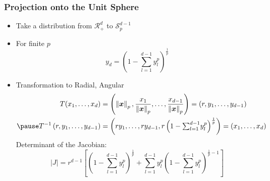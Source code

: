 \documentclass[aspectratio=169]{beamer}
\newcommand{\norm}[1]{\left\lVert #1 \right\rVert}
\newcommand{\pnorm}[2]{\norm{#1}_{#2}}
\begin{document}
\begin{frame}
  \frametitle{Projection onto the Unit Sphere}
  \begin{itemize}
    \item Take a distribution from $\mathcal{R}_+^{d}$ to $\mathcal{S}_{p}^{d-1}$
    \pause
    \item For finite $p$
      \begin{equation*}
        y_d = \left(1 - {\textstyle\sum}_{l = 1}^{d-1}y_l^p\right)^{\frac{1}{p}}
      \end{equation*}
    \pause
    \item Transformation to Radial, Angular
    \begin{equation*}
        \begin{aligned}
      T(x_1,\ldots,x_d) &= \left(\pnorm{\bm{x}}{p}, \frac{x_1}{\pnorm{\bm{x}}{p}},
                    \ldots , \frac{x_{d-1}}{\pnorm{\bm{x}}{p}}\right) = (r,y_1,\ldots,y_{d-1})\\
                    \pause
    T^{-1}\left(r,y_1,\ldots,y_{d-1}\right) &=
      \left(ry_1,\ldots,ry_{d-1}, r\left(1 - {\textstyle\sum}_{l = 1}^{d-1}y_l^p\right)^{\frac{1}{p}}\right) = (x_1,\ldots,x_d)
      \end{aligned}
    \end{equation*}
    \pause
    Determinant of the Jacobian:
    \begin{equation*}
        \lvert J \rvert = r^{d-1}\left[\left(1 - {\textstyle\sum}_{l = 1}^{d-1}y_l^p\right)^{\frac{1}{p}} +
      {\textstyle\sum}_{l = 1}^{d-1}y_l^p\left(1 - {\textstyle\sum}_{l=1}^{d-1}
          y_l^p\right)^{\frac{1}{p} - 1}\right]
    \end{equation*}
  \end{itemize}
\end{frame} %
\end{document}
